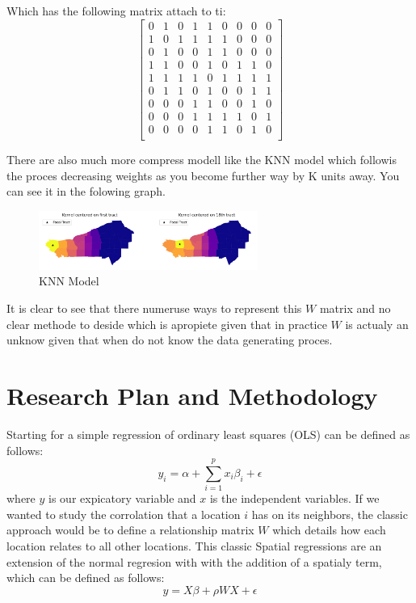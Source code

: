 \documentclass{article}
\begin{document}
Which has the following matrix attach to ti:
\[
	\begin{bmatrix}
		0 & 1 & 0 & 1 & 1 & 0 & 0 & 0 & 0 \\
		1 & 0 & 1 & 1 & 1 & 1 & 0 & 0 & 0 \\
		0 & 1 & 0 & 0 & 1 & 1 & 0 & 0 & 0 \\
		1 & 1 & 0 & 0 & 1 & 0 & 1 & 1 & 0 \\
		1 & 1 & 1 & 1 & 0 & 1 & 1 & 1 & 1 \\
		0 & 1 & 1 & 0 & 1 & 0 & 0 & 1 & 1 \\
		0 & 0 & 0 & 1 & 1 & 0 & 0 & 1 & 0 \\
		0 & 0 & 0 & 1 & 1 & 1 & 1 & 0 & 1 \\
		0 & 0 & 0 & 0 & 1 & 1 & 0 & 1 & 0 \\
	\end{bmatrix}
\]


There are also much more compress modell like the KNN model which followis the proces decreasing weights
as you become further way by K units away. You can see it in the folowing graph.

\begin{figure}[H]
	\centering
	\includegraphics[width=0.64\textwidth]{assets/kmodel.png}
	\caption{KNN Model}
\end{figure}

It is clear to see that there numeruse ways to represent this $W$ matrix and no clear methode to deside which is apropiete
given that in practice $W$ is actualy an unknow given that when do not know the data generating proces.

\section{Research Plan and Methodology}

Starting for a simple regression of ordinary least squares (OLS) can be defined as follows:
\begin{equation}
	y_i = \alpha + \sum^p_{i=1} x_i \beta_i + \epsilon
	\label{eq:OLS}
\end{equation}
where $y$ is our expicatory variable and $x$ is the independent variables. If we wanted to study the corrolation that a location $i$ has on its neighbors, the classic approach would be
to define a relationship matrix $W$ which details how each location relates to all other locations. This classic Spatial regressions are an extension of the normal regresion with with
the addition of a spatialy term, which can be defined as follows:
\begin{equation}
	y = X \beta + \rho W X + \epsilon
	\label{eq:SDM}
\end{equation}
\end{document}

